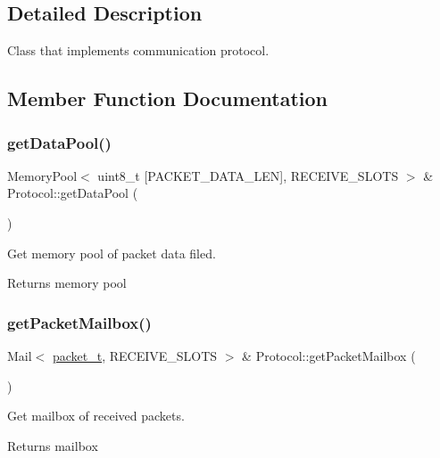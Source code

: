 \subsection{Detailed Description}
Class that implements communication protocol. 

\subsection{Member Function Documentation}
\mbox{\label{classProtocol_a14e37a62910d1e8550e2623ecdf23e7d}} 
\subsubsection{\texorpdfstring{get\+Data\+Pool()}{getDataPool()}}
{\footnotesize\ttfamily Memory\+Pool$<$ uint8\+\_\+t \mbox{[}P\+A\+C\+K\+E\+T\+\_\+\+D\+A\+T\+A\+\_\+\+L\+EN\mbox{]}, R\+E\+C\+E\+I\+V\+E\+\_\+\+S\+L\+O\+TS $>$ \& Protocol\+::get\+Data\+Pool (\begin{DoxyParamCaption}{ }\end{DoxyParamCaption})}



Get memory pool of packet data filed. 

\begin{DoxyReturn}{Returns}
memory pool 
\end{DoxyReturn}
\mbox{\label{classProtocol_a4ba79add81128e7a7e47ed261fdb6023}} 
\subsubsection{\texorpdfstring{get\+Packet\+Mailbox()}{getPacketMailbox()}}
{\footnotesize\ttfamily Mail$<$ \hyperlink{structpacket__t}{packet\+\_\+t}, R\+E\+C\+E\+I\+V\+E\+\_\+\+S\+L\+O\+TS $>$ \& Protocol\+::get\+Packet\+Mailbox (\begin{DoxyParamCaption}{ }\end{DoxyParamCaption})}



Get mailbox of received packets. 

\begin{DoxyReturn}{Returns}
mailbox 
\end{DoxyReturn}
\mbox{\label{classProtocol_a916dbbd29a4d74a20a46d1331af1f769}} 
